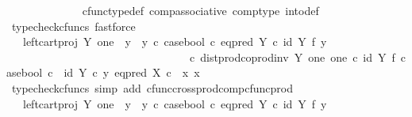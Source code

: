 \begin{isabellebody}
\ \ \ \ \ \ \ \ \ \ \ \ \isamarkupfalse%
\ cfunc{\isacharunderscore}{\kern0pt}type{\isacharunderscore}{\kern0pt}def\ comp{\isacharunderscore}{\kern0pt}associative\ comp{\isacharunderscore}{\kern0pt}type\ into{\isacharunderscore}{\kern0pt}def\ \isamarkupfalse%
\ {\isacharparenleft}{\kern0pt}typecheck{\isacharunderscore}{\kern0pt}cfuncs{\isacharcomma}{\kern0pt}\ fastforce{\isacharparenright}{\kern0pt}\isanewline
\ \ \ \ \ \ \ \ \ \ \isamarkupfalse%
\ \isamarkupfalse%
\ {\isachardoublequoteopen}{\isachardot}{\kern0pt}{\isachardot}{\kern0pt}{\isachardot}{\kern0pt}\ {\isacharequal}{\kern0pt}\ {\isacharparenleft}{\kern0pt}left{\isacharunderscore}{\kern0pt}cart{\isacharunderscore}{\kern0pt}proj\ Y\ one\ {\isasymamalg}\ {\isacharparenleft}{\kern0pt}{\isacharparenleft}{\kern0pt}y{}\ {\isasymamalg}\ y{}{\isacharparenright}{\kern0pt}\ {\isasymcirc}\isactrlsub c\ case{\isacharunderscore}{\kern0pt}bool\ {\isasymcirc}\isactrlsub c\ eq{\isacharunderscore}{\kern0pt}pred\ Y\ {\isasymcirc}\isactrlsub c\ {\isacharparenleft}{\kern0pt}id\ Y\ {\isasymtimes}\isactrlsub f\ y{}{\isacharparenright}{\kern0pt}{\isacharparenright}{\kern0pt}{\isacharparenright}{\kern0pt}\isanewline
\ \ \ \ \ \ \ \ \ \ \ \ \ \ \ \ \ \ \ \ \ \ \ \ \ \ \ \ \ \ \ \ \ {\isasymcirc}\isactrlsub c\ dist{\isacharunderscore}{\kern0pt}prod{\isacharunderscore}{\kern0pt}coprod{\isacharunderscore}{\kern0pt}inv\ Y\ one\ one\ {\isasymcirc}\isactrlsub c\ {\isacharparenleft}{\kern0pt}id\ Y\ {\isasymtimes}\isactrlsub f\ case{\isacharunderscore}{\kern0pt}bool{\isacharparenright}{\kern0pt}\ {\isasymcirc}\isactrlsub c\ \ {\isasymlangle}id\ Y\ {\isasymcirc}\isactrlsub c\ y{\isacharcomma}{\kern0pt}\ eq{\isacharunderscore}{\kern0pt}pred\ X\ {\isasymcirc}\isactrlsub c\ \ {\isasymlangle}x{\isacharcomma}{\kern0pt}\ x{\isasymrangle}{\isasymrangle}{\isachardoublequoteclose}\isanewline
\ \ \ \ \ \ \ \ \ \ \ \ \isamarkupfalse%
\ {\isacharparenleft}{\kern0pt}typecheck{\isacharunderscore}{\kern0pt}cfuncs{\isacharcomma}{\kern0pt}\ simp\ add{\isacharcolon}{\kern0pt}\ cfunc{\isacharunderscore}{\kern0pt}cross{\isacharunderscore}{\kern0pt}prod{\isacharunderscore}{\kern0pt}comp{\isacharunderscore}{\kern0pt}cfunc{\isacharunderscore}{\kern0pt}prod{\isacharparenright}{\kern0pt}\isanewline
\ \ \ \ \ \ \ \ \ \isamarkupfalse%
\ \isamarkupfalse%
\ {\isachardoublequoteopen}{\isachardot}{\kern0pt}{\isachardot}{\kern0pt}{\isachardot}{\kern0pt}\ {\isacharequal}{\kern0pt}\ {\isacharparenleft}{\kern0pt}left{\isacharunderscore}{\kern0pt}cart{\isacharunderscore}{\kern0pt}proj\ Y\ one\ {\isasymamalg}\ {\isacharparenleft}{\kern0pt}{\isacharparenleft}{\kern0pt}y{}\ {\isasymamalg}\ y{}{\isacharparenright}{\kern0pt}\ {\isasymcirc}\isactrlsub c\ case{\isacharunderscore}{\kern0pt}bool\ {\isasymcirc}\isactrlsub c\ eq{\isacharunderscore}{\kern0pt}pred\ Y\ {\isasymcirc}\isactrlsub c\ {\isacharparenleft}{\kern0pt}id\ Y\ {\isasymtimes}\isactrlsub f\ y{}{\isacharparenright}{\kern0pt}{\isacharparenright}{\kern0pt}{\isacharparenright}{\kern0pt}\ \isanewline

\end{isabellebody}
